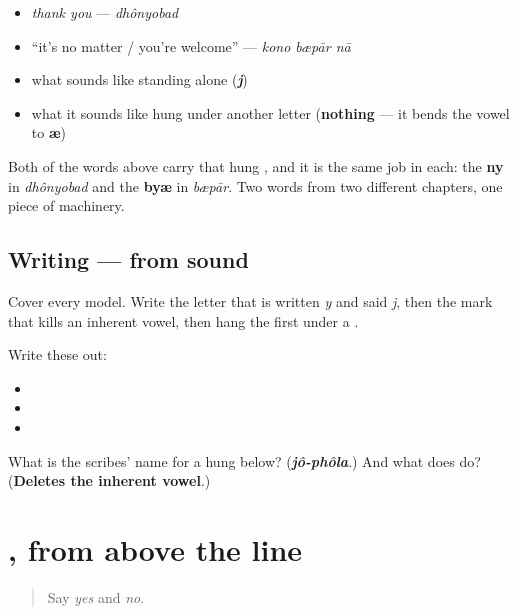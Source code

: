 \begin{itemize}
\raggedright
  \item \emph{thank you} — \emph{dhônyobad}
  \item \textquotedblleft{}it's no matter / you're welcome\textquotedblright{} — \emph{kono bæpār nā}
  \item what \textbf{} sounds like standing alone (\emph{\textbf{j}})
  \item what it sounds like hung under another letter (\textbf{nothing} — it bends the vowel to \textbf{æ})
\end{itemize}

Both of the words above carry that hung \textbf{}, and it is the same job in each: the \textbf{ny} in \emph{dhônyobad} and the \textbf{byæ} in \emph{bæpār}. Two words from two different chapters, one piece of machinery.

\subsection*{Writing — from sound}
Cover every model. Write the letter that is written \emph{y} and said \emph{j}, then the mark that kills an inherent vowel, then hang the first under a \textbf{}.

Write these out:

\begin{itemize}
\raggedright
  \item {}
  \item {}
  \item {}
\end{itemize}

\begin{tcolorbox}[breakable,colback=teal!4,colframe=teal!35!black,title={Before you move on}]
What is the scribes' name for a \textbf{} hung below? (\emph{\textbf{jô-phôla}}.) And what does \textbf{} do? (\textbf{Deletes the inherent vowel}.)
\end{tcolorbox}
\section[Practice]{, from above the line}

\label{lesson:BN-R01-chandrabindu-again}



\begin{quote}
Say \emph{yes} and \emph{no}.
\end{quote}

